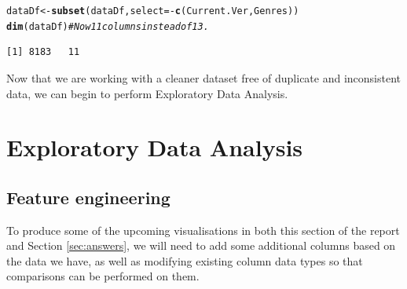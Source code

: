 \documentclass[12pt]{report}\usepackage[]{graphicx}\usepackage[]{xcolor}
\makeatletter
\newcommand{\hlcom}[1]{\textcolor[rgb]{0.678,0.584,0.686}{\textit{#1}}}%
\newcommand{\hlopt}[1]{\textcolor[rgb]{0,0,0}{#1}}%
\newcommand{\hlstd}[1]{\textcolor[rgb]{0.345,0.345,0.345}{#1}}%
\newcommand{\hlkwb}[1]{\textcolor[rgb]{0.69,0.353,0.396}{#1}}%
\newcommand{\hlkwc}[1]{\textcolor[rgb]{0.333,0.667,0.333}{#1}}%
\newcommand{\hlkwd}[1]{\textcolor[rgb]{0.737,0.353,0.396}{\textbf{#1}}}%
\newenvironment{kframe}{%
 \def\at@end@of@kframe{}%
 \ifinner\ifhmode%
  \def\at@end@of@kframe{\end{minipage}}%
  \begin{minipage}{\columnwidth}%
 \fi\fi%
 \def\FrameCommand##1{\hskip\@totalleftmargin \hskip-\fboxsep
 \colorbox{shadecolor}{##1}\hskip-\fboxsep
     \hskip-\linewidth \hskip-\@totalleftmargin \hskip\columnwidth}%
 \MakeFramed {\advance\hsize-\width
   \@totalleftmargin\z@ \linewidth\hsize
   \@setminipage}}%
 {\par\unskip\endMakeFramed%
 \at@end@of@kframe}
\newenvironment{knitrout}{}{} %
\makeatother
\begin{document}
\begin{knitrout}
\color{fgcolor}\begin{kframe}
\begin{alltt}
\hlstd{dataDf} \hlkwb{<-} \hlkwd{subset}\hlstd{(dataDf,} \hlkwc{select} \hlstd{=} \hlopt{-}\hlkwd{c}\hlstd{(Current.Ver, Genres))}
\hlkwd{dim}\hlstd{(dataDf)} \hlcom{# Now 11 columns instead of 13.}
\end{alltt}
\begin{verbatim}
[1] 8183   11
\end{verbatim}
\end{kframe}
\end{knitrout}

Now that we are working with a cleaner dataset free of duplicate and inconsistent data, we can
begin to perform Exploratory Data Analysis.

\pagebreak %

\section{Exploratory Data Analysis}
\subsection{Feature engineering}
To produce some of the upcoming visualisations in both this section of the report and Section \ref{sec:answers}, 
we will need to add some additional columns based on the data we have, as well as modifying existing column 
data types so that comparisons can be performed on them.
\end{document}
